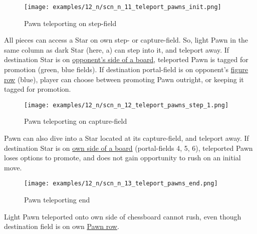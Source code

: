 \vspace*{-1.4\baselineskip}
\noindent
\begin{figure}[!h]
\texttt{[image: examples/12\_n/scn\_n\_11\_teleport\_pawns\_init.png]}
\caption{Pawn teleporting on step-field}
\label{fig:scn_n_11_teleport_pawns_init}
\end{figure}

All pieces can access a Star on own step- or capture-field. So, light Pawn in
the same column as dark Star (here, a) can step into it, and teleport away. If
destination Star is on
\hyperref[sec:Definitions/Sides of a chessboard]{opponent's side of a board},
teleported Pawn is tagged for
promotion (green, blue fields). If destination portal-field is on opponent's
\hyperref[sec:Terms/Figure row]{figure row} (blue), player can choose between
promoting Pawn outright, or keeping it tagged for promotion.

\clearpage %

\noindent
\begin{figure}[!h]
\texttt{[image: examples/12\_n/scn\_n\_12\_teleport\_pawns\_step\_1.png]}
\caption{Pawn teleporting on capture-field}
\label{fig:scn_n_12_teleport_pawns_step_1}
\end{figure}

Pawn can also dive into a Star located at its capture-field, and teleport away.
If destination Star is on
\hyperref[sec:Definitions/Sides of a chessboard]{own side of a board} (portal-fields
4, 5, 6), teleported Pawn loses options to promote, and does not gain opportunity
to rush on an initial move.

\clearpage %

\noindent
\begin{figure}[!h]
\texttt{[image: examples/12\_n/scn\_n\_13\_teleport\_pawns\_end.png]}
\caption{Pawn teleporting end}
\label{fig:scn_n_13_teleport_pawns_end}
\end{figure}

Light Pawn teleported onto own side of chessboard cannot rush, even though
destination field is on own \hyperref[sec:Terms/Pawn row]{Pawn row}.

